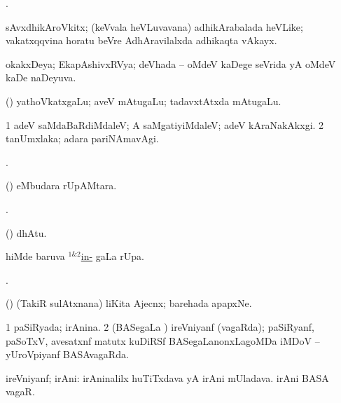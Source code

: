 \bentry
{}
\gl{\saMkiSx}
\bmng
{}. 
\emng
\eentry

\bentry
{}
\gl{\nA}
\expl{\Latin }
\bmng
sAvxdhikAroVkitx; (keVvala heVLuvavana) adhikArabalada heVLike; vakatxqqvina horatu beVre AdhAravilalxda adhikaqta vAkayx. 
\emng
\eentry

\bentry
{}
\gl{\gu}
\bmng
okakxDeya; EkapAshivxRVya; deVhada -- oMdeV kaDege seVrida yA oMdeV kaDe naDeyuva. 
\emng
\eentry

\bentry
{}
\gl{\nA}
\expl{\Latin }
\bmng
(\bava) yathoVkatxgaLu; aveV mAtugaLu; tadavxtAtxda mAtugaLu. 
\emng
\eentry

\bentry
{}
\gl{\kirxvi}
\expl{\Latin }
\bmng
\bnum
\num{1} adeV saMdaBaRdiMdaleV; A saMgatiyiMdaleV; adeV kAraNakAkxgi. 
\num{2} tanUmxlaka; adara pariNAmavAgi. 
\enum
\emng
\eentry

\bentry
{}
\gl{\saMkiSx}
\bmng
{}. 
\emng
\eentry

\bentry
{}
\gl{\uparx}
\bmng
(\pArxparx)  eMbudara rUpAMtara. 
\emng
\eentry

\bentry
{}
\gl{\saMkiSx}
\bmng
{}. 
\emng
\eentry

\bentry
{}
\gl{\saMkeV}
\bmng
(\ravi)  dhAtu. 
\emng
\eentry

\bentry
{}
\gl{\pUparx}
\bmng
{} hiMde baruva \hyperlink{in-(1)}{$^{1 \& 2}$in-} \pUparx gaLa rUpa. 
\emng
\eentry

\bentry
{}
\gl{\saMkiSx}
\bmng
{}. 
\emng
\eentry

\bentry
{}
\gl{\nA}
\bmng
(\ca) (TakiR sulAtxnana) liKita Ajecnx; barehada apapxNe. 
\emng
\eentry

\bentry
{}
\gl{\gu}
\bmng
\bnum
\num{1} paSiRyada; irAnina. 
\num{2} (BASegaLa \vi) ireVniyanf (vagaRda); paSiRyanf, paSoTxV, avesatxnf matutx kuDiRSf BASegaLanonxLagoMDa iMDoV -- yUroVpiyanf BASAvagaRda. 
\enum
\emng
\eentry

\bentry
{}
\gl{\nA}
\bmng
ireVniyanf; irAni: 
\banum
{} irAninalilx huTiTxdava yA irAni mUladava. 
 irAni BASA vagaR. 
\eanum
\emng
\eentry

